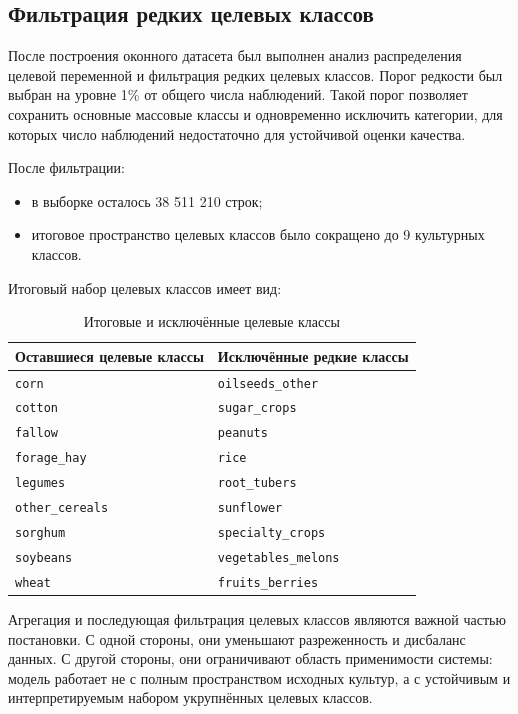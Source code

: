 \subsection{Фильтрация редких целевых классов}

После построения оконного датасета был выполнен анализ распределения целевой переменной и фильтрация редких
целевых классов. Порог редкости был выбран на уровне 1\% от общего числа наблюдений. Такой порог позволяет сохранить
основные массовые классы и одновременно исключить категории, для которых число
наблюдений недостаточно для устойчивой оценки качества.

После фильтрации:

\begin{itemize}
\tightlist
\item
  в выборке осталось 38 511 210 строк;
\item
  итоговое пространство целевых классов было сокращено до 9 культурных классов.
\end{itemize}

Итоговый набор целевых классов имеет вид:

\begin{table}[htbp]
\centering
\caption{Итоговые и исключённые целевые классы}
\label{tab:target-classes}
\begin{tabular}{ll}
\toprule
Оставшиеся целевые классы & Исключённые редкие классы \\
\midrule
\texttt{corn} & \texttt{oilseeds\_other} \\
\texttt{cotton} & \texttt{sugar\_crops} \\
\texttt{fallow} & \texttt{peanuts} \\
\texttt{forage\_hay} & \texttt{rice} \\
\texttt{legumes} & \texttt{root\_tubers} \\
\texttt{other\_cereals} & \texttt{sunflower} \\
\texttt{sorghum} & \texttt{specialty\_crops} \\
\texttt{soybeans} & \texttt{vegetables\_melons} \\
\texttt{wheat} & \texttt{fruits\_berries} \\
\bottomrule
\end{tabular}
\end{table}

Агрегация и последующая фильтрация целевых классов являются важной частью постановки. С одной стороны, они уменьшают
разреженность и дисбаланс данных. С другой стороны, они ограничивают область применимости системы: модель работает не с
полным пространством исходных культур, а с устойчивым и интерпретируемым набором укрупнённых целевых классов.

